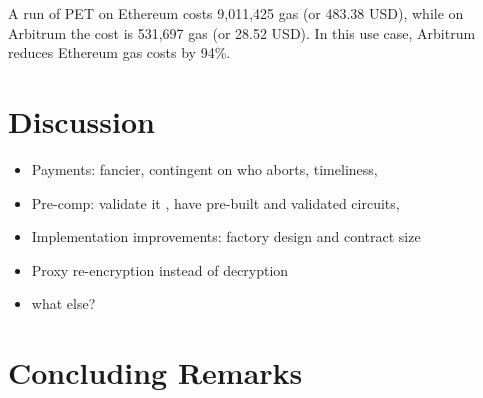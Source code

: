 A run of PET on Ethereum costs 9,011,425 gas (or 483.38 USD), while on Arbitrum the cost is 531,697 gas (or 28.52 USD). In this use case, Arbitrum reduces Ethereum gas costs by 94\%.  





\section{Discussion}
\label{sec:discussion}
\begin{itemize}
\item Payments: fancier, contingent on who aborts, timeliness, \etc
\item Pre-comp: validate it , have pre-built and validated circuits, \etc
\item Implementation improvements: factory design and contract size
\item Proxy re-encryption instead of decryption
\item what else?
\end{itemize}


\section{Concluding Remarks}

